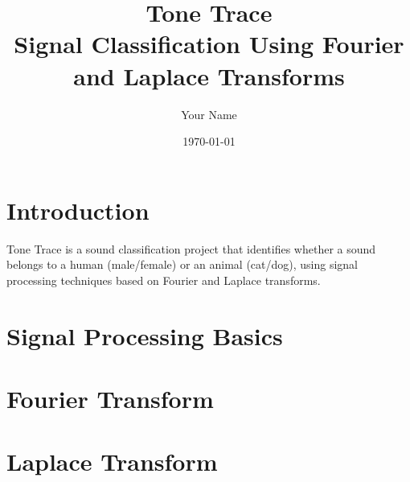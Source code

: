\documentclass[12pt]{article}
\title{Tone Trace \\ \large Signal Classification Using Fourier and Laplace Transforms}
\author{Your Name}
\date{\today}
\begin{document}
\maketitle
\tableofcontents
\newpage

\section{Introduction}
Tone Trace is a sound classification project that identifies whether a sound belongs to a human (male/female) or an animal (cat/dog), using signal processing techniques based on Fourier and Laplace transforms.

\section{Signal Processing Basics}


\section{Fourier Transform}


\section{Laplace Transform}

\end{document}
